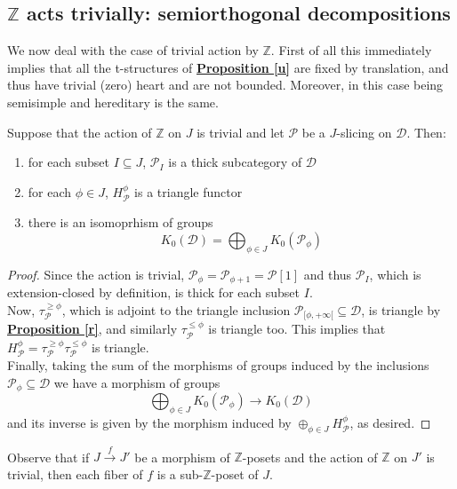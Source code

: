 \newpage 
\subsection{$\mathbb{Z}$ acts trivially: semiorthogonal decompositions} 
We now deal with the case of trivial action by $\mathbb{Z}$. First of all this immediately implies that all the t-structures of \hyperref[u]{\textbf{Proposition \ref*{u}}} are fixed by translation, and thus have trivial (zero) heart and are not bounded. Moreover, in this case being semisimple and hereditary is the same. 

\begin{prop}\label{mam}
  Suppose that the action of $\mathbb{Z}$ on $J$ is trivial and let $\mathscr{P}$ be a $J$-slicing on $\mathscr{D}$. Then:
  \begin{enumerate}
  \item for each subset $I \subseteq J$, $\mathscr{P}_I$ is a thick subcategory of $\mathscr{D}$ 
  \item for each $\phi \in J$, $H^{\phi}_{\mathscr{P}}$ is a triangle functor
   \item there is an isomoprhism of groups $$K_0(\mathscr{D})=\bigoplus_{\phi \in J}K_0(\mathscr{P}_{\phi})$$

  \end{enumerate} 
\end{prop}

\begin{proof}
  Since the action is trivial, $\mathscr{P}_{\phi}=\mathscr{P}_{\phi +1}=\mathscr{P}[1]$ and thus $\mathscr{P}_I$, which is extension-closed by definition, is thick for each subset $I$. \\ Now, $\tau^{\ge \phi}_{\mathscr{P}}$, which is adjoint to the triangle inclusion $\mathscr{P}_{[\phi,+\infty[} \subseteq \mathscr{D}$, is triangle by \hyperref[r]{\textbf{Proposition \ref*{r}}}, and similarly $\tau^{\le \phi}_{\mathscr{P}}$ is triangle too. This implies that $H^{\phi}_{\mathscr{P}}=\tau^{\ge \phi}_{\mathscr{P}}\tau^{\le \phi}_{\mathscr{P}}$ is triangle. \\
      Finally, taking the sum of the morphisms of groups induced by the inclusions $\mathscr{P}_{\phi} \subseteq \mathscr{D}$ we have a morphism of groups $$\bigoplus_{\phi \in J}K_0(\mathscr{P}_{\phi}) \longrightarrow K_0(\mathscr{D})$$
and its inverse is given by the morphism induced by $\oplus_{\phi \in J}H^{\phi}_{\mathscr{P}}$, as desired. 
\end{proof} 

Observe that if $J \overset{f}{\longrightarrow} J'$ be a morphism of $\mathbb{Z}$-posets and the action of $\mathbb{Z}$ on $J'$ is trivial, then each fiber of $f$ is a sub-$\mathbb{Z}$-poset of $J$. \\

